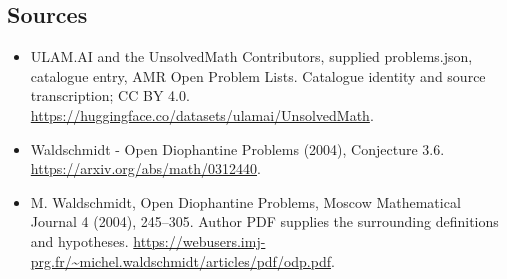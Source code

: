 \documentclass[11pt,a4paper]{article}
\begin{document}
\subsection{Sources}
\begin{itemize}
\item[S1] ULAM.AI and the UnsolvedMath Contributors, supplied problems.json, catalogue entry, AMR Open Problem Lists. Catalogue identity and source transcription; CC BY 4.0.
\url{https://huggingface.co/datasets/ulamai/UnsolvedMath}.
\item[S2] Waldschmidt - Open Diophantine Problems (2004), Conjecture 3.6. 
\url{https://arxiv.org/abs/math/0312440}.
\item[S3] M. Waldschmidt, Open Diophantine Problems, Moscow Mathematical Journal 4 (2004), 245–305. Author PDF supplies the surrounding definitions and hypotheses.
\url{https://webusers.imj-prg.fr/~michel.waldschmidt/articles/pdf/odp.pdf}.
\end{itemize}
\end{document}
